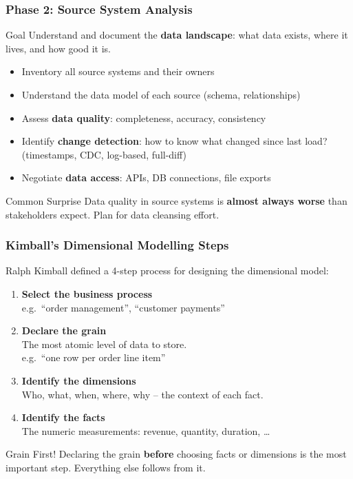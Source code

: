 \begin{frame}
  \frametitle{Phase 2: Source System Analysis}

  \begin{block}{Goal}
    Understand and document the \textbf{data landscape}: what data exists,
    where it lives, and how good it is.
  \end{block}

  \begin{itemize}
    \item Inventory all source systems and their owners
    \item Understand the data model of each source (schema, relationships)
    \item Assess \textbf{data quality}: completeness, accuracy, consistency
    \item Identify \textbf{change detection}: how to know what changed since last load?
      (timestamps, CDC, log-based, full-diff)
    \item Negotiate \textbf{data access}: APIs, DB connections, file exports
  \end{itemize}

  \begin{alertblock}{Common Surprise}
    Data quality in source systems is \textbf{almost always worse}
    than stakeholders expect. Plan for data cleansing effort.
  \end{alertblock}

\end{frame}

\begin{frame}
  \frametitle{Kimball's Dimensional Modelling Steps}

  Ralph Kimball defined a 4-step process for designing the dimensional model:

  \begin{enumerate}
    \item \textbf{Select the business process}\\
      e.g.\ ``order management'', ``customer payments''
    \item \textbf{Declare the grain}\\
      The most atomic level of data to store.\\
      e.g.\ ``one row per order line item''
    \item \textbf{Identify the dimensions}\\
      Who, what, when, where, why -- the context of each fact.
    \item \textbf{Identify the facts}\\
      The numeric measurements: revenue, quantity, duration, \ldots
  \end{enumerate}

  \begin{alertblock}{Grain First!}
    Declaring the grain \textbf{before} choosing facts or dimensions
    is the most important step. Everything else follows from it.
  \end{alertblock}

\end{frame}

